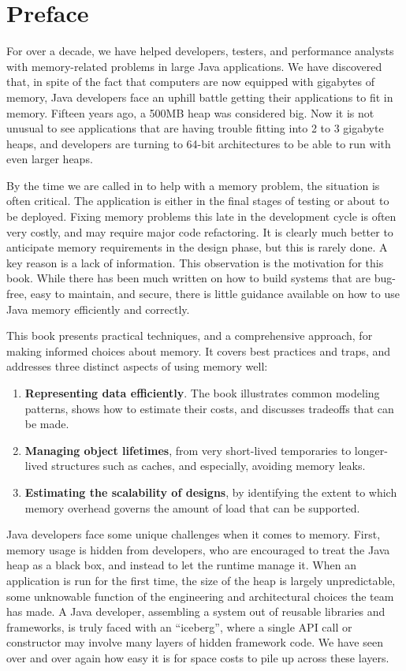 \chapter*{Preface}
\label{chapter:preface}

For over a decade, we have helped developers, testers, and performance
analysts with memory-related problems in large Java applications.  
We have discovered that, in spite of the fact that computers are now equipped
with gigabytes of memory, Java developers face an uphill battle getting their applications to fit
in memory. Fifteen years ago, a 500MB heap was considered big.  Now it is not
unusual to see applications that are having trouble fitting into 2 to 3
gigabyte heaps, and developers are turning to 64-bit architectures to be able to
run with even larger heaps.

By the time we are called in to help with a memory problem, the situation
is often critical. The application is either in the final stages of testing or
about to be deployed. Fixing memory problems this late in the development cycle
is often very costly, and may require major code refactoring. It is clearly much
better to anticipate memory requirements in the design phase, but this is rarely
done. A key reason is a lack of information. This observation is the motivation for this book. While
there has been much written on how to build systems that are bug-free, easy to maintain, and secure, there is
little guidance available on how to use Java memory efficiently and correctly.

This book presents practical techniques, and a comprehensive approach, for
making informed choices about memory. It
covers best practices and traps, and addresses three distinct aspects of using memory well:
\begin{enumerate}
	\item \textbf{Representing data efficiently}. The book illustrates
	common modeling patterns, shows how to estimate their costs, and
	discusses tradeoffs that can be made.
	\item \textbf{Managing object lifetimes}, from very
	short-lived temporaries to longer-lived structures such as caches, and
	especially, avoiding memory leaks.
	\item \textbf{Estimating the scalability of designs}, by identifying the
	extent to which memory overhead governs the amount of load that can be
	supported.
\end{enumerate}

Java developers face some
unique challenges when it comes to memory.
First, memory usage is hidden from developers, who are
encouraged to treat the Java heap as a black box, and instead to let the runtime manage it. 
When an
application is run for the first time, the size of the heap is largely
unpredictable, some unknowable function of the engineering and architectural
choices the team has made.
A Java developer, assembling a system out of reusable libraries and frameworks,
is truly faced with an ``iceberg'', where a single API call or constructor may
involve many layers of hidden framework code. We have seen over and over again
how easy it is for space costs to pile up across these layers.

